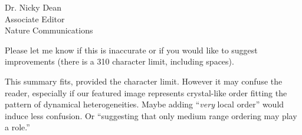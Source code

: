 \documentclass[a4paper, rebuttal, parskip=true, firsthead=false, fromemail=true, foldmarks=false]{scrlttr2}
\begin{document}
\begin{letter}{Dr. Nicky Dean\\
Associate Editor\\
Nature Communications}
\begin{quotationi}
Please let me know if this is inaccurate or if you would like to suggest improvements (there is a 310 character limit, including spaces).
\end{quotationi}
This summary fits, provided the character limit. However it may confuse the reader, especially if our featured image represents crystal-like order fitting the pattern of dynamical heterogeneities. Maybe adding ``\textit{very} local order'' would induce less confusion. Or ``suggesting that only medium range ordering may play a role.''

\end{letter} 
\end{document}
